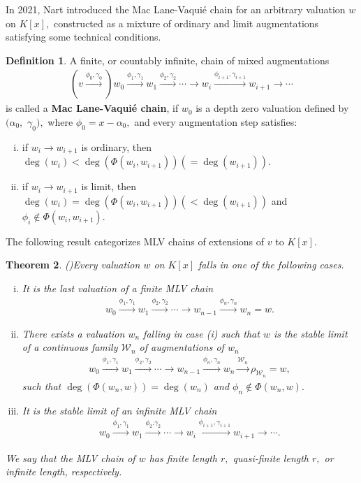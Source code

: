 \documentclass[11pt]{amsart}
\newtheorem{theorem}{Theorem}[section]
\theoremstyle{definition}
\newtheorem{definition}[theorem]{Definition}
\theoremstyle{remark}
\numberwithin{equation}{section}
\begin{document}
\vspace{.20pt}

In 2021, Nart \cite{EN1} introduced the Mac Lane-Vaqui\'e chain for an arbitrary valuation $w$ on $K[x],$ constructed as a mixture of ordinary and limit augmentations satisfying some technical conditions. 


\begin{definition}
	A finite, or countably infinite, chain of mixed augmentations 
	\begin{align*}
			(v\xrightarrow{\phi_0,\gamma_0})w_0\xrightarrow{\phi_1,\gamma_1} w_1\xrightarrow{\phi_2,\gamma_2}\cdots \longrightarrow w_{i}\xrightarrow{\phi_{i+1},\gamma_{i+1}} w_{i+1}\longrightarrow\cdots
	\end{align*} is called a {\bf Mac Lane-Vaqui\'e  chain}, if  $w_0$ is a depth zero valuation defined by $(\alpha_0,$ $\gamma_0),$ where $\phi_0=x-\alpha_0,$ and every augmentation step satisfies:
	\begin{enumerate}[(i)]
		\item if $w_{i}\rightarrow w_{i+1}$ is ordinary, then $\deg (w_{i})<\deg(\Phi(w_{i},w_{i+1}))(=\deg(w_{i+1})).$
		\item if $w_{i}\rightarrow w_{i+1}$ is limit, then $\deg (w_{i})=\deg(\Phi(w_{i},w_{i+1}))(<\deg(w_{i+1}))$ and $\phi_{i}\notin\Phi(w_{i},w_{i+1}).$
	\end{enumerate}
	
\end{definition}
The following result categorizes MLV chains of extensions of $v$ to $K[x].$
\begin{theorem}(\cite[Theorem 4.3]{EN1})\label{mlvt1}
	Every valuation $w$ on $K[x]$ falls in one of the following cases. 
	\begin{enumerate}[(i)]
		\item It is the last valuation of a finite MLV chain
		\begin{align*}
			w_0\xrightarrow{\phi_1,\gamma_1} w_1\xrightarrow{\phi_2,\gamma_2}\cdots \longrightarrow w_{n-1}\xrightarrow{\phi_n,\gamma_n} w_n=w.
		\end{align*}
		\item There exists a valuation $w_n$ falling in case (i) such that $w$  is the stable limit of a continuous family ${\mathcal{W}_n}$ of augmentations of $w_n$
		\begin{align*}
			w_0\xrightarrow{\phi_1,\gamma_1} w_1\xrightarrow{\phi_2,\gamma_2}\cdots \longrightarrow w_{n-1}\xrightarrow{\phi_n,\gamma_n} w_n\xrightarrow {{\mathcal{W}_n}} \rho_{\mathcal{W}_n}=w,
		\end{align*}
		such that $\deg(\Phi(w_n,w))=\deg(w_n)$ and $\phi_n\notin \Phi(w_n, w).$
		\item It is the stable limit of an infinite MLV chain 
		\begin{align*}
			w_0\xrightarrow{\phi_1,\gamma_1} w_1\xrightarrow{\phi_2.\gamma_2}\cdots \longrightarrow w_{i}\xrightarrow{\phi_{i+1},\gamma_{i+1}} w_{i+1}\longrightarrow\cdots .
		\end{align*}
	\end{enumerate}
	We say that the MLV chain of  $w$ has finite length $r,$ quasi-finite length $r,$ or infinite length, respectively.
\end{theorem}
\end{document}
